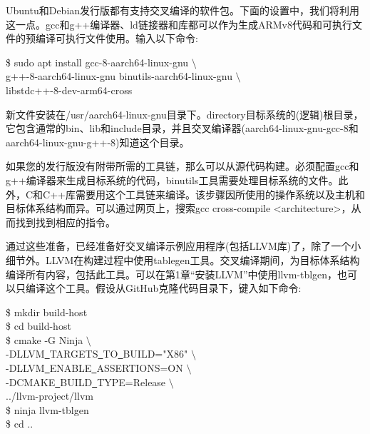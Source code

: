 Ubuntu和Debian发行版都有支持交叉编译的软件包。下面的设置中，我们将利用这一点。gcc和g++编译器、ld链接器和库都可以作为生成ARMv8代码和可执行文件的预编译可执行文件使用。输入以下命令:\par

\begin{tcolorbox}[colback=white,colframe=black]
\$ sudo apt install gcc-8-aarch64-linux-gnu $\setminus$ \\
\hspace*{1cm}g++-8-aarch64-linux-gnu binutils-aarch64-linux-gnu $\setminus$ \\
\hspace*{1cm}libstdc++-8-dev-arm64-cross
\end{tcolorbox}

新文件安装在/usr/aarch64-linux-gnu目录下。directory目标系统的(逻辑)根目录，它包含通常的bin、lib和include目录，并且交叉编译器(aarch64-linux-gnu-gcc-8和aarch64-linux-gnu-g++-8)知道这个目录。\par

\begin{tcolorbox}[colback=blue!5!white,colframe=blue!75!black, title=在其他系统上交叉编译]
如果您的发行版没有附带所需的工具链，那么可以从源代码构建。必须配置gcc和g++编译器来生成目标系统的代码，binutils工具需要处理目标系统的文件。此外，C和C++库需要用这个工具链来编译。该步骤因所使用的操作系统以及主机和目标体系结构而异。可以通过网页上，搜索gcc cross-compile <architecture>，从而找到找到相应的指令。
\end{tcolorbox}

通过这些准备，已经准备好交叉编译示例应用程序(包括LLVM库)了，除了一个小细节外。LLVM在构建过程中使用tablegen工具。交叉编译期间，为目标体系结构编译所有内容，包括此工具。可以在第1章“安装LLVM”中使用llvm-tblgen，也可以只编译这个工具。假设从GitHub克隆代码目录下，键入如下命令:\par

\begin{tcolorbox}[colback=white,colframe=black]
\$ mkdir build-host \\
\$ cd build-host \\
\$ cmake -G Ninja $\setminus$ \\
\hspace*{1cm}-DLLVM\underline{~}TARGETS\underline{~}TO\underline{~}BUILD="X86" $\setminus$ \\
\hspace*{1cm}-DLLVM\underline{~}ENABLE\underline{~}ASSERTIONS=ON $\setminus$ \\
\hspace*{1cm}-DCMAKE\underline{~}BUILD\underline{~}TYPE=Release $\setminus$ \\
\hspace*{1cm}../llvm-project/llvm \\
\$ ninja llvm-tblgen \\
\$ cd ..
\end{tcolorbox}

